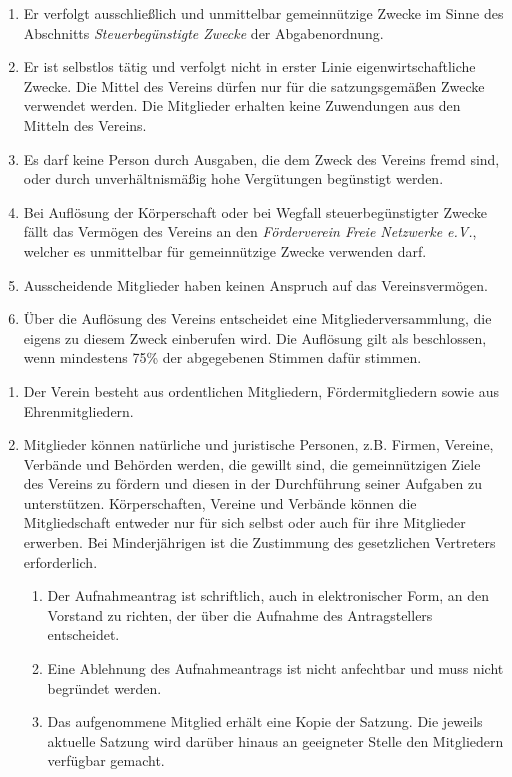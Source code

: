 \documentclass[parskip=half]{scrartcl}
\begin{document}
\begin{contract}
\begin{enumerate}
			\item Er verfolgt ausschließlich und unmittelbar gemeinnützige Zwecke im Sinne des Abschnitts \textit{Steuerbegünstigte Zwecke} der Abgabenordnung.
			\item Er ist selbstlos tätig und verfolgt nicht in erster Linie eigenwirtschaftliche Zwecke. Die Mittel des Vereins dürfen nur für die satzungsgemäßen Zwecke verwendet werden. Die Mitglieder erhalten keine Zuwendungen aus den Mitteln des Vereins.
			\item Es darf keine Person durch Ausgaben, die dem Zweck des Vereins fremd sind, oder durch unverhältnismäßig hohe Vergütungen begünstigt werden.
			\item Bei Auflösung der Körperschaft oder bei Wegfall steuerbegünstigter Zwecke fällt das Vermögen des Vereins an den \textit{Förderverein Freie Netzwerke e.V.}, welcher es unmittelbar für gemeinnützige Zwecke verwenden darf.
			\item Ausscheidende Mitglieder haben keinen Anspruch auf das Vereinsvermögen.
			\item Über die Auflösung des Vereins entscheidet eine Mitgliederversammlung, die eigens zu diesem Zweck einberufen wird. Die Auflösung gilt als beschlossen, wenn mindestens 75\% der abgegebenen Stimmen dafür stimmen.
		\end{enumerate}
		\begin{enumerate}
			\item Der Verein besteht aus ordentlichen Mitgliedern, Fördermitgliedern sowie aus Ehrenmitgliedern.
			\item Mitglieder können natürliche und juristische Personen, z.B. Firmen, Vereine, Verbände und Behörden werden, die gewillt sind, die gemeinnützigen Ziele des Vereins zu fördern und diesen in der Durchführung seiner Aufgaben zu unterstützen. Körperschaften, Vereine und Verbände können die Mitgliedschaft entweder nur für sich selbst oder auch für ihre Mitglieder erwerben. Bei Minderjährigen ist die Zustimmung des gesetzlichen Vertreters erforderlich.
			\begin{enumerate}
				\item Der Aufnahmeantrag ist schriftlich, auch in elektronischer Form, an den Vorstand zu richten, der über die Aufnahme des Antragstellers entscheidet.
				\item Eine Ablehnung des Aufnahmeantrags ist nicht anfechtbar und muss nicht begründet werden.
				\item Das aufgenommene Mitglied erhält eine Kopie der Satzung. Die jeweils aktuelle Satzung wird darüber hinaus an geeigneter Stelle den Mitgliedern verfügbar gemacht.

\end{enumerate}
\end{enumerate}
\end{contract}
\end{document}
